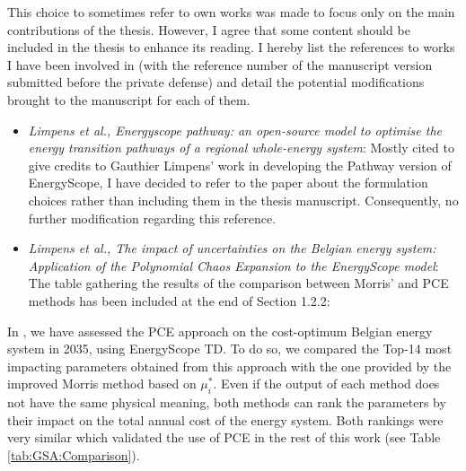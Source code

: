 \documentclass[12pt,a4paper]{article}
\begin{document}
\noindent This choice to sometimes refer to own works was made to focus only on the main contributions of the thesis. However, I agree that some content should be included in the thesis to enhance its reading. I hereby list the references to works I have been involved in (with the reference number of the manuscript version submitted before the private defense) and detail the potential modifications brought to the manuscript for each of them.

\begin{itemize}
\item \emph{\cite{limpens2024pathway} Limpens et al., Energyscope pathway: an open-source model to optimise the energy transition pathways of a regional whole-energy system}: Mostly cited to give credits to Gauthier Limpens' work in developing the Pathway version of EnergyScope, I have decided to refer to the paper about the formulation choices rather than including them in the thesis manuscript. Consequently, no further modification regarding this reference.
\item \emph{\cite{limpens2020impact} Limpens et al., The impact of uncertainties on the Belgian energy system: Application of the Polynomial Chaos Expansion to the EnergyScope model}: The table gathering the results of the comparison between Morris' and PCE methods has been included {\color{blue}at the end of Section 1.2.2}:
\end{itemize} 

\begin{mdframed}[style=manuscript] %
In \cite{limpens2020impact}, we have assessed the PCE approach on the cost-optimum Belgian energy system in 2035, using EnergyScope TD. To do so, we compared the Top-14 most impacting parameters obtained from this approach with the one provided by the improved Morris method based on $\mu^*_{i}$. Even if the output of each method does not have the same physical meaning, both methods can rank the parameters by their impact on the total annual cost of the energy system. Both rankings were very similar which validated the use of PCE in the rest of this work (see Table \ref{tab:GSA:Comparison}).
\end{mdframed}
\end{document}
